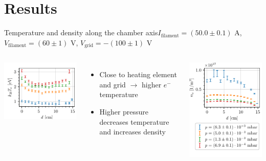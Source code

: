 \documentclass[10pt]{beamer}
\newcommand{\filamentcurrent}{\ensuremath{I_{\mathrm{filament}}}}
\newcommand{\filamentpolarisation}{\ensuremath{V_{\mathrm{filament}}}}
\newcommand{\gridpolarisation}{\ensuremath{V_{\mathrm{grid}}}}
\newcommand{\electron}[0]{$e^{-}$}
\begin{document}
\section{Results}
\begin{frame}{Temperature and density along the chamber axis}{$\filamentcurrent = (50.0 \pm 0.1)$ A, $\filamentpolarisation = (60 \pm 1)$ V, $\gridpolarisation = - (100 \pm 1)$ V}
    \begin{columns}[T]
        \centering
        {\includegraphics[scale=1]{../figures/temperatureeV_position.pdf}}
        \begin{itemize}
            \item Close to heating element and grid \(\rightarrow\) higher \electron temperature
            \item Higher pressure decreases temperature and increases density
        \end{itemize}

        \centering
        {\includegraphics[scale=1]{../figures/density_position.pdf}}
    \end{columns}

\end{frame}
    
\end{document}

